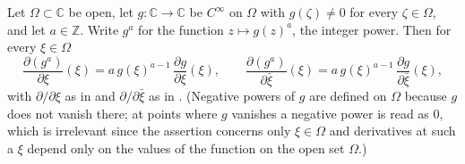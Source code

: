 \begin{lemma}
Let $\Omega\subset\mathbb{C}$ be open, let $g\colon\mathbb{C}\to\mathbb{C}$ be
$C^\infty$ on $\Omega$ with $g(\zeta)\neq0$ for every $\zeta\in\Omega$, and let
$a\in\mathbb{Z}$.  Write $g^a$ for the function $z\mapsto g(z)^a$, the integer
power.  Then for every $\xi\in\Omega$
\[
  \frac{\partial(g^a)}{\partial\xi}(\xi)=a\,g(\xi)^{a-1}\,\frac{\partial g}{\partial\xi}(\xi),
  \qquad
  \frac{\partial(g^a)}{\partial\bar\xi}(\xi)=a\,g(\xi)^{a-1}\,\frac{\partial g}{\partial\bar\xi}(\xi),
\]
with $\partial/\partial\xi$ as in  and $\partial/\partial\bar\xi$
as in .  (Negative powers of $g$ are defined on $\Omega$
because $g$ does not vanish there; at points where $g$ vanishes a negative
power is read as $0$, which is irrelevant since the assertion concerns only
$\xi\in\Omega$ and derivatives at such a $\xi$ depend only on the values of
the function on the open set $\Omega$.)
\end{lemma}
